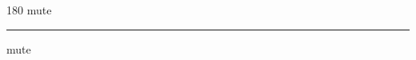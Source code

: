 
\begin{frame}
\begin{center}
\begin{turn}{180}
{\fontsize{2.5cm}{1em}\selectfont mute}
\end{turn}
\vspace{1em}\par  
\hrule
\vspace{1em}\par  
{\fontsize{2.5cm}{1em}\selectfont mute}
\end{center}
\end{frame}
